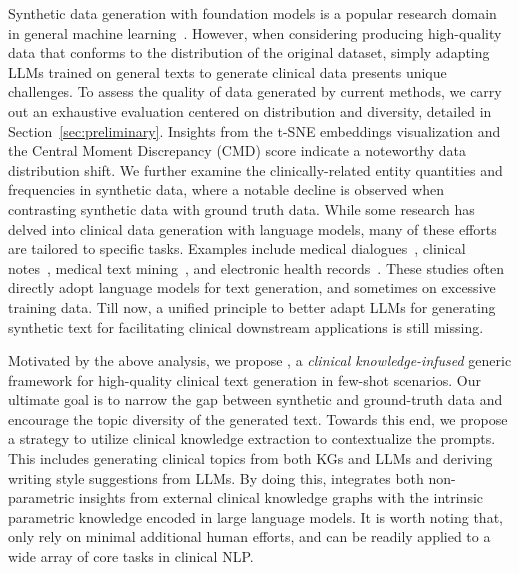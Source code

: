 Synthetic data generation with foundation models is a popular research domain in general machine learning~\citep{azizi2023synthetic,borisov2023language,openvik,meng2022generating,ye2022zerogen,ye2022progen}. However, when considering producing high-quality data that conforms to the distribution of the original dataset, simply adapting LLMs trained on general texts to generate clinical data presents unique challenges. To assess the quality of data generated by current methods, we carry out an exhaustive evaluation centered on distribution and diversity, detailed in Section~\ref{sec:preliminary}. Insights from the t-SNE embeddings visualization and the Central Moment Discrepancy (CMD) score indicate a noteworthy data distribution shift. We further examine the clinically-related entity quantities and frequencies in synthetic data, where a notable decline is observed when contrasting synthetic data with ground truth data.  
While some research has delved into clinical data generation with language models, many of these efforts are tailored to specific tasks. 
Examples include medical dialogues~\citep{chintagunta2021medically}, clinical notes~\citep{giorgi2023clinical}, medical text mining~\citep{tang2023does}, and electronic health records~\citep{promptehr,theodorou2023synthesize,qian2023synthetic}. 
These studies often directly adopt language models for text generation, and sometimes on excessive training data.
Till now, a unified principle to better adapt LLMs for generating synthetic text for facilitating clinical downstream applications is still missing.

Motivated by the above analysis, we propose \ours, a \emph{clinical knowledge-infused} generic framework for high-quality clinical text generation in few-shot scenarios. 
Our ultimate goal is to narrow the gap between synthetic and ground-truth data and encourage the topic diversity of the generated text. 
Towards this end, we propose a strategy to utilize clinical knowledge extraction to contextualize the prompts. This includes generating clinical topics from both KGs and LLMs and deriving writing style suggestions from LLMs. 
By doing this, {\ours} integrates both non-parametric insights from external clinical knowledge graphs with the intrinsic parametric knowledge encoded in large language models.
It is worth noting that, \ours only rely on minimal additional human efforts, and can be readily applied to a wide array of core tasks in clinical NLP.

